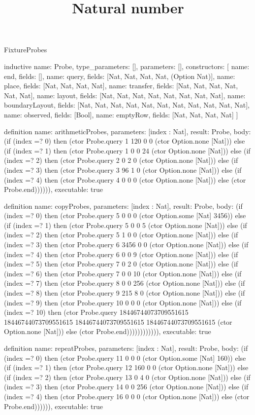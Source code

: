 \begin{lexlean}{FixtureProbes}
\title{Natural number}
\begin{semanticmodule}
inductive{
  name: Probe,
  type_parameters: [],
  parameters: [],
  constructors: [
    {name: end, fields: []},
    {name: query, fields: [Nat, Nat, Nat, Nat, (Option Nat)]},
    {name: place, fields: [Nat, Nat, Nat, Nat]},
    {name: transfer, fields: [Nat, Nat, Nat, Nat, Nat, Nat]},
    {name: layout, fields: [Nat, Nat, Nat, Nat, Nat, Nat, Nat, Nat]},
    {name: boundaryLayout, fields: [Nat, Nat, Nat, Nat, Nat, Nat, Nat, Nat, Nat, Nat, Nat]},
    {name: observed, fields: [Bool]},
    {name: emptyRow, fields: [Nat, Nat, Nat, Nat]}
  ]
}

definition{
  name: arithmeticProbes,
  parameters: [index : Nat],
  result: Probe,
  body: (if (index =? 0) then (ctor Probe.query 1 120 0 0 (ctor Option.none [Nat])) else (if (index =? 1) then (ctor Probe.query 1 0 0 24 (ctor Option.none [Nat])) else (if (index =? 2) then (ctor Probe.query 2 0 2 0 (ctor Option.none [Nat])) else (if (index =? 3) then (ctor Probe.query 3 96 1 0 (ctor Option.none [Nat])) else (if (index =? 4) then (ctor Probe.query 4 0 0 0 (ctor Option.none [Nat])) else (ctor Probe.end)))))),
  executable: true
}

definition{
  name: copyProbes,
  parameters: [index : Nat],
  result: Probe,
  body: (if (index =? 0) then (ctor Probe.query 5 0 0 0 (ctor Option.some [Nat] 3456)) else (if (index =? 1) then (ctor Probe.query 5 0 0 5 (ctor Option.none [Nat])) else (if (index =? 2) then (ctor Probe.query 5 1 0 0 (ctor Option.none [Nat])) else (if (index =? 3) then (ctor Probe.query 6 3456 0 0 (ctor Option.none [Nat])) else (if (index =? 4) then (ctor Probe.query 6 0 0 9 (ctor Option.none [Nat])) else (if (index =? 5) then (ctor Probe.query 7 0 2 0 (ctor Option.none [Nat])) else (if (index =? 6) then (ctor Probe.query 7 0 0 10 (ctor Option.none [Nat])) else (if (index =? 7) then (ctor Probe.query 8 0 0 256 (ctor Option.none [Nat])) else (if (index =? 8) then (ctor Probe.query 9 215 8 0 (ctor Option.none [Nat])) else (if (index =? 9) then (ctor Probe.query 10 0 0 0 (ctor Option.none [Nat])) else (if (index =? 10) then (ctor Probe.query 18446744073709551615 18446744073709551615 18446744073709551615 18446744073709551615 (ctor Option.none [Nat])) else (ctor Probe.end)))))))))))),
  executable: true
}

definition{
  name: repeatProbes,
  parameters: [index : Nat],
  result: Probe,
  body: (if (index =? 0) then (ctor Probe.query 11 0 0 0 (ctor Option.some [Nat] 160)) else (if (index =? 1) then (ctor Probe.query 12 160 0 0 (ctor Option.none [Nat])) else (if (index =? 2) then (ctor Probe.query 13 0 4 0 (ctor Option.none [Nat])) else (if (index =? 3) then (ctor Probe.query 14 0 0 256 (ctor Option.none [Nat])) else (if (index =? 4) then (ctor Probe.query 16 0 0 0 (ctor Option.none [Nat])) else (ctor Probe.end)))))),
  executable: true
}


\end{semanticmodule}
\end{lexlean}

